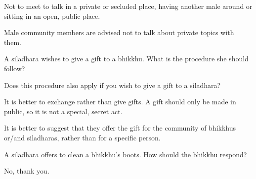 \begin{solution}
  Not to meet to talk in a private or secluded place,
  having another male around or sitting in an open, public place.

  Male community members are advised not to talk about private topics with them.
\end{solution}

\bigskip

A siladhara wishes to give a gift to a bhikkhu. What is the procedure she should follow?

\bigskip

Does this procedure also apply if you wish to give a gift to a siladhara?

\begin{solution}
  It is better to exchange rather than give gifts.
  A gift should only be made in public, so it is not a special, secret act.

  It is better to suggest that they offer the gift for the community of bhikkhus or/and siladharas,
  rather than for a specific person.
\end{solution}

\bigskip

A siladhara offers to clean a bhikkhu's boots. How should the bhikkhu respond?

\begin{solution}
  No, thank you.
\end{solution}
